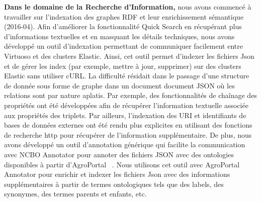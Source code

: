 \textbf{Dans le domaine de la Recherche d’Information,} nous avons commencé à travailler sur l’indexation des graphes RDF et leur enrichissement sémantique (2016-04). Afin d'améliorer la fonctionnalité Quick Search en récupérant plus d'informations textuelles et en masquant les détails techniques, nous avons développé un outil d'indexation permettant de communiquer facilement entre Virtuoso et des clusters Elastic. Ainsi, cet outil permet d’indexer les fichiers Json et de gérer les index (par exemple, mettre à jour, supprimer) sur des clusters Elastic sans utiliser cURL. La difficulté résidait dans le passage d'une structure de donnée sous forme de graphe dans un document document JSON où les relations sont par nature aplatis. Par exemple, des fonctionnalités de chaînage des propriétés ont été développées afin de récupérer l'information textuelle associée aux propriétés des triplets. Par ailleurs, l'indexation des URI et identifiants de bases de données externes ont été rendu plus explicites en utilisant des fonctions de recherche http pour récupérer de l'information supplémentaire. De plus, nous avons développé un outil d'annotation générique qui facilite la communication avec NCBO Annotator pour annoter des fichiers JSON avec des ontologies disponibles à partir d'AgroPortal ~\cite{Jonquet2018}. Nous utilisons cet outil avec AgroPortal Annotator pour enrichir et indexer les fichiers Json avec des informations supplémentaires à partir de termes ontologiques tels que des labels, des synonymes, des termes parents et enfants, etc.\\

